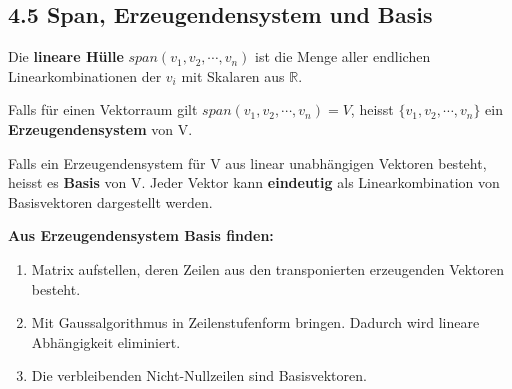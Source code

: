 \subsection{4.5 Span, Erzeugendensystem und Basis}{
\vskip3pt

Die \textbf{lineare Hülle} $span(v_1, v_2, \dotsm, v_n)$ ist die Menge aller endlichen Linearkombinationen der $v_i$ mit Skalaren aus $\mathbb{R}$. 
\par
\vskip3pt
Falls für einen Vektorraum gilt $span(v_1, v_2, \dotsm, v_n) = V$, heisst $\{ v_1, v_2, \dotsm, v_n\}$ ein \textbf{Erzeugendensystem} von V. \par
\vskip3pt
Falls ein Erzeugendensystem für V aus linear unabhängigen Vektoren besteht, heisst es \textbf{Basis} von V. Jeder Vektor kann \textbf{eindeutig} als Linearkombination von Basisvektoren dargestellt werden.

\vskip8pt
\textbf{Aus Erzeugendensystem Basis finden:}
\begin{enumerate}[label=\protect\circled{\arabic*}]
\item Matrix aufstellen, deren Zeilen aus den transponierten erzeugenden Vektoren besteht.
\item Mit Gaussalgorithmus in Zeilenstufenform bringen. Dadurch wird lineare Abhängigkeit eliminiert.
\item Die verbleibenden Nicht-Nullzeilen sind Basisvektoren.
\end{enumerate}
\vspace{-3pt}
}
